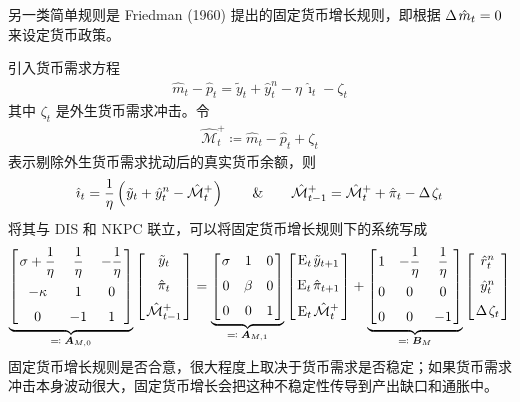 另一类简单规则是 Friedman (1960) 提出的固定货币增长规则，即根据 \(\Delta\mspace{2mu}\hat m_t=0\) 来设定货币政策。

引入货币需求方程
\begin{align*}
    \hat m_t-\hat p_t
        =\tilde y_t+\hat y^n_t-\eta\,\hat\imath_t-\zeta_t
\end{align*}
其中 \(\zeta_t\) 是外生货币需求冲击。令
\begin{align*}
    \hat{\mathcal M}^{+}_t\coloneq\hat m_t-\hat p_t+\zeta_t
\end{align*}
表示剔除外生货币需求扰动后的真实货币余额，则
\begin{align*}
    \hat\imath_t
        =\dfrac1\eta\left(\mspace{1mu}\tilde y_t+\hat y^n_t-\hat{\mathcal M}^{+}_t\mspace{1mu}\right)
    \qquad \& \qquad
    \hat{\mathcal M}^{+}_{t-1}
        =\hat{\mathcal M}^{+}_t+\hat\pi_t-\Delta\mspace{2mu}\zeta_t
\end{align*}
将其与 DIS 和 NKPC 联立，可以将固定货币增长规则下的系统写成
\begin{align*}
    \underbrace{\matbks{
        \sigma+\dfrac1\eta & \dfrac1\eta & -\dfrac1\eta \\[10pt]
        -\kappa & 1 & 0 \\[6pt]
        0 & -1 & 1
    }}_{\eqcolon\;\bsA_{M,0}}
    \matbks{\tilde y_t \\[6pt] \hat\pi_t \\[6pt] \hat{\mathcal M}^{+}\lt}
    =
    \underbrace{\matbks{
        \sigma & 1 & 0 \\[6pt]
        0 & \beta & 0 \\[6pt]
        0 & 0 & 1
    }}_{\eqcolon\;\bsA_{M,1}}
    \matbks{\meant\,\tilde y\nt \\[6pt] \meant\,\hat\pi\nt \\[6pt] \meant\,\hat{\mathcal M}^{+}_t}
    +\underbrace{\matbks{
        1 & -\dfrac1\eta & \dfrac1\eta \\[10pt]
        0 & 0 & 0 \\[6pt]
        0 & 0 & -1
    }}_{\eqcolon\;\bs B_M}
    \matbks{\hat r^n_t \\[6pt] \hat y^n_t \\[6pt] \D\zeta_t}
\end{align*}
固定货币增长规则是否合意，很大程度上取决于货币需求是否稳定；如果货币需求冲击本身波动很大，固定货币增长会把这种不稳定性传导到产出缺口和通胀中。




\SymmetricGeometry
